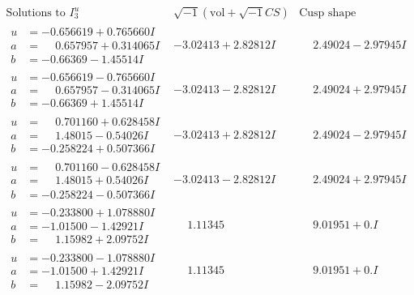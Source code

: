\documentclass[1p]{elsarticle_modified}
\theoremstyle{definition}
\newcommand{\I}{\sqrt{-1}}
\begin{document}
$$\begin{array}{c|c|c}  
\text{Solutions to }I^u_{3}& \I (\text{vol} + \sqrt{-1}CS) & \text{Cusp shape}\\
 \hline 
\begin{aligned}
u &= -0.656619 + 0.765660 I \\
a &= \phantom{-}0.657957 + 0.314065 I \\
b &= -0.66369 - 1.45514 I\end{aligned}
 & -3.02413 + 2.82812 I & \phantom{-}2.49024 - 2.97945 I \\ \hline\begin{aligned}
u &= -0.656619 - 0.765660 I \\
a &= \phantom{-}0.657957 - 0.314065 I \\
b &= -0.66369 + 1.45514 I\end{aligned}
 & -3.02413 - 2.82812 I & \phantom{-}2.49024 + 2.97945 I \\ \hline\begin{aligned}
u &= \phantom{-}0.701160 + 0.628458 I \\
a &= \phantom{-}1.48015 - 0.54026 I \\
b &= -0.258224 + 0.507366 I\end{aligned}
 & -3.02413 + 2.82812 I & \phantom{-}2.49024 - 2.97945 I \\ \hline\begin{aligned}
u &= \phantom{-}0.701160 - 0.628458 I \\
a &= \phantom{-}1.48015 + 0.54026 I \\
b &= -0.258224 - 0.507366 I\end{aligned}
 & -3.02413 - 2.82812 I & \phantom{-}2.49024 + 2.97945 I \\ \hline\begin{aligned}
u &= -0.233800 + 1.078880 I \\
a &= -1.01500 - 1.42921 I \\
b &= \phantom{-}1.15982 + 2.09752 I\end{aligned}
 & \phantom{-}1.11345\phantom{ +0.000000I} & \phantom{-}9.01951 + 0. I\phantom{ +0.000000I} \\ \hline\begin{aligned}
u &= -0.233800 - 1.078880 I \\
a &= -1.01500 + 1.42921 I \\
b &= \phantom{-}1.15982 - 2.09752 I\end{aligned}
 & \phantom{-}1.11345\phantom{ +0.000000I} & \phantom{-}9.01951 + 0. I\phantom{ +0.000000I} \\ \hline\begin{aligned}

\end{aligned}
\end{array}$$
\end{document}
